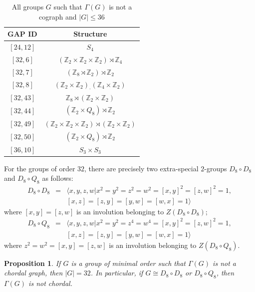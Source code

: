 \documentclass{elsarticle}
\newtheorem{prop}[theorem]{Proposition}
\begin{document}
\begin{table}[htbp]\centering
\caption{All groups $G$ such that $\Gamma(G)$ is not a cograph and $|G|\le 36$  \label{tab1}}
\vskip2mm
{\tabcolsep=10pt
\begin{tabular}{|c|c|}
\hline
GAP ID    &  Structure                                  \\  \hline
$[24,12]$   & $S_4$                           \\
$[32,6]$  & $(\mathbb{Z}_2\times \mathbb{Z}_2\times \mathbb{Z}_2)\rtimes \mathbb{Z}_4$   \\
$[32,7]$  & $(\mathbb{Z}_8 \rtimes \mathbb{Z}_2)\rtimes \mathbb{Z}_2$                                \\
$[32,8]$  & $(\mathbb{Z}_2\times \mathbb{Z}_2)_{\cdot}(\mathbb{Z}_4\times \mathbb{Z}_2)$                               \\
$[32,43]$  & $\mathbb{Z}_8 \rtimes (\mathbb{Z}_2\times \mathbb{Z}_2)$                                 \\
$[32,44]$  & $(\mathbb{Z}_2\times Q_8)\rtimes \mathbb{Z}_2$                 \\
$[32,49]$  & $(\mathbb{Z}_2\times\mathbb{Z}_2\times\mathbb{Z}_2)\rtimes(\mathbb{Z}_2\times\mathbb{Z}_2)$  \\
$[32,50]$  & $(\mathbb{Z}_2\times Q_8)\rtimes \mathbb{Z}_2$   \\
$[36,10]$  & $S_3\times S_3$                                          \\
 \hline
\end{tabular}}
\end{table}

For the groups of order $32$, there are precisely two extra-special $2$-groups $D_8\circ D_8$ and $D_8\circ Q_8$ as follows:
\begin{eqnarray}\label{g-1}
  D_8\circ D_8&=&\langle x,y,z,w|x^2=y^2=z^2=w^2=[x,y]^2=[z,w]^2=1, \\
   &&[x,z]=[z,y]=[y,w]=[w,x]=1 \rangle
\end{eqnarray}
where $[x,y]=[z,w]$ is an involution belonging to $Z(D_8\circ D_8)$;
\begin{eqnarray}\label{g-2}
  D_8\circ Q_8&=&\langle x,y,z,w|x^2=y^2=z^4=w^4=[x,y]^2=[z,w]^2=1, \\
   &&[x,z]=[z,y]=[y,w]=[w,x]=1 \rangle
\end{eqnarray}
where $z^2=w^2=[x,y]=[z,w]$ is an involution belonging to $Z(D_8\circ Q_8)$.


\begin{prop}
If $G$ is a group of minimal order such that $\Gamma(G)$ is not a chordal graph, then $|G|=32$. In particular, if
$G\cong D_8\circ D_8$ or $D_8\circ Q_8$, then $\Gamma(G)$ is not chordal.
\end{prop}
\end{document}

